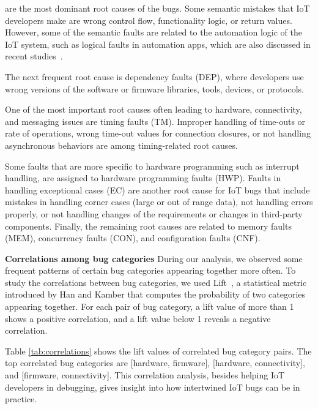  are the most dominant root causes of the bugs. Some semantic mistakes that IoT developers make are wrong control flow,  functionality logic, or return values. However, some of the semantic faults are related to the automation logic of the IoT system, such as logical faults in automation apps, which are also discussed in recent studies~\cite{ISSTA2020Interactions}. 

The next frequent root cause is dependency faults (DEP), where developers use wrong versions of the software or firmware libraries, tools, devices, or protocols.

One of the most important root causes often leading to hardware, connectivity, and messaging issues are timing faults (TM). Improper handling of time-outs or rate of operations, wrong time-out values for connection closures, or not handling asynchronous behaviors are among timing-related root causes.

Some faults that are more specific to hardware programming such as interrupt handling, are assigned to hardware programming faults (HWP). Faults in handling exceptional cases (EC) are another root cause for IoT bugs that include mistakes in handling corner cases (large or out of range data), not handling errors properly, or not handling changes of the requirements or changes in third-party components. Finally, the remaining root causes are related to memory faults (MEM), concurrency faults (CON), and configuration faults (CNF). 


\textbf{Correlations among bug categories}
During our analysis, we observed some frequent patterns of certain bug categories appearing together more often. To study the correlations between bug categories, we used Lift~\cite{kamber2001data}, a statistical metric introduced by Han and Kamber that computes the probability of two categories appearing together. For each pair of bug category, a lift value of more than 1 shows a positive correlation, and a lift value below 1 reveals a negative correlation. 

Table \ref{tab:correlations} shows the lift values of correlated bug category pairs. The top correlated bug categories are [hardware, firmware], [hardware, connectivity], and [firmware, connectivity]. This correlation analysis, besides helping IoT developers in debugging, gives insight into how intertwined IoT bugs can be in practice.

